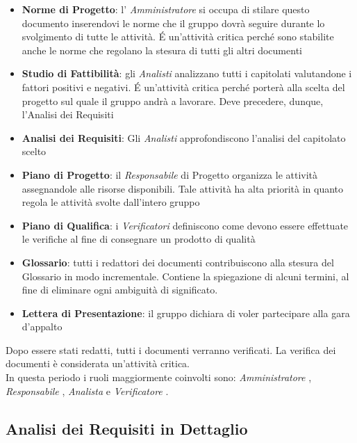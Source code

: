 \begin{itemize}
\item \textbf{Norme di Progetto}: l’ \emph{Amministratore}  si occupa di stilare questo documento
  inserendovi le norme che il gruppo dovrà seguire durante lo svolgimento di tutte
  le attività. \'E un'attività critica perché sono stabilite anche le norme
  che regolano la stesura di tutti gli altri documenti

\item \textbf{Studio di Fattibilità}: gli  \emph{Analisti}  analizzano tutti i capitolati valutandone
  i fattori positivi e negativi. \'E un'attività critica perché porterà alla scelta del
  progetto sul quale il gruppo andrà a lavorare. Deve precedere, dunque, l'Analisi dei
  Requisiti

\item \textbf{Analisi dei Requisiti}: Gli  \emph{Analisti}  approfondiscono l'analisi del capitolato
  scelto

\item \textbf{Piano di Progetto}: il  \emph{Responsabile}  di Progetto organizza le attività assegnandole
  alle risorse disponibili. Tale attività ha alta priorità in quanto regola le attività
  svolte dall'intero gruppo

\item \textbf{Piano di Qualifica}: i  \emph{Verificatori}  definiscono come devono essere effettuate le
  verifiche al fine di consegnare un prodotto di qualità

\item \textbf{Glossario}: tutti i redattori dei documenti contribuiscono alla stesura del
  Glossario in modo incrementale. Contiene la spiegazione di alcuni termini, al fine di
  eliminare ogni ambiguità di significato.

\item \textbf{Lettera di Presentazione}: il gruppo dichiara di voler partecipare alla gara d'appalto

\end{itemize}

Dopo essere stati redatti, tutti i documenti verranno  verificati. La verifica dei
documenti è considerata un'attività critica.\\
In questa periodo i ruoli maggiormente coinvolti sono:  \emph{Amministratore} ,  \emph{Responsabile} ,
 \emph{Analista}  e  \emph{Verificatore} .

\subsection{Analisi dei Requisiti in Dettaglio}

